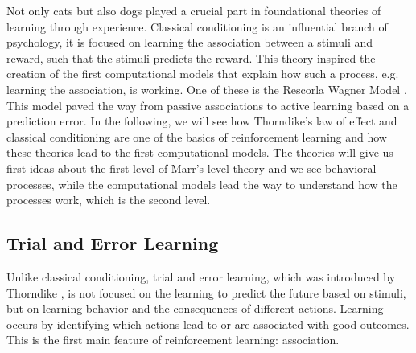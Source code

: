 Not only cats but also dogs played a crucial part in foundational theories of learning through experience. 
Classical conditioning \citep{pavlov1927conditional} is an influential branch of psychology, it is focused on learning the association between a stimuli and reward, such that the stimuli predicts the reward. %
This theory inspired the creation of the first computational models that explain how such a process, e.g. learning the association, is working.  %
One of these is the Rescorla Wagner Model \citep{rescorla1972theory}. %
This model paved the way from passive associations to active learning based on a prediction error. %
In the following, we will see how Thorndike's law of effect and classical conditioning are one of the basics of reinforcement learning and how these theories lead to the first computational models. %
The theories will give us first ideas about the first level of Marr's level theory and we see behavioral processes, while the computational models lead the way to understand how the processes work, which is the second level. %

\subsection{Trial and Error Learning}
Unlike classical conditioning, trial and error learning, which was introduced by Thorndike \citep{thorndike1927law}, is not focused on the learning to predict the future based on stimuli, but on learning behavior and the consequences of different actions. Learning occurs by identifying which actions lead to or are associated with good outcomes. This is the first main feature of reinforcement learning: association. 

